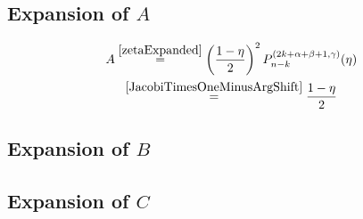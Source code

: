 \documentclass{article}
\numberwithin{equation}{section}
\numberwithin{figure}{section}
\begin{document}
\subsection{Expansion of \texorpdfstring{$A$}{A}}

\begin{multline}\label{firstEtaExpansion-1}
A \stackrel{\eqref{zetaExpanded}}{=} \left(\frac{1-\eta}{2}\right)^2 P^{(2k+\alpha+\beta+1,\gamma)}_{n-k}(\eta)\\
\stackrel{\eqref{JacobiTimesOneMinusArgShift}}{=} \frac{1-\eta}{2}
\end{multline}

\subsection{Expansion of \texorpdfstring{$B$}{B}}

\subsection{Expansion of \texorpdfstring{$C$}{C}}
\end{document}
